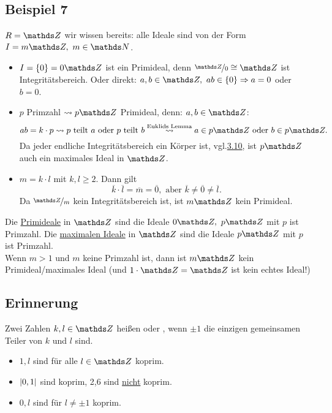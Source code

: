 \subsection{Beispiel 7}
\label{sub:bsp_7}
$R=\Z$ wir wissen bereits: alle Ideale sind von der Form $I=m\Z,~m\in \N$.
\begin{itemize}
	\item $I=\{0\}=0\Z$ ist ein Primideal, denn $\nicefrac{\Z}{0}\cong \Z$ ist Integritätsbereich.
	Oder direkt: $a,b\in \Z,~ab\in\{0\}\Rightarrow a=0$ oder $b=0$.
	\item $p$ Primzahl $\rightsquigarrow p\Z$ Primideal, denn: $a,b\in\Z$:
	\[
	ab=k\cdot p\rightsquigarrow p\text{ teilt }a\text{ oder }p\text{ teilt }b\stackrel{\text{Euklids Lemma}}{\rightsquigarrow}a\in p\Z \text{ oder }b\in p\Z.
	\]
	Da jeder endliche Integritätsbereich ein Körper ist, vgl.\hyperref[sub:def_integritaetsbereich]{3.10}, ist $p\Z$ auch ein maximales Ideal in $\Z$.
	\item $m=k\cdot l$ mit $k,l\ge 2$.
	Dann gilt 
	\[
	\overline{k}\cdot\overline{l}=\overline{m}=\overline{0}, \text{ aber }\overline{k}\neq\overline{0}\neq\overline{l}.
	\]
	Da $\nicefrac{\Z}{m}$ kein Integritätsbereich ist, ist $m\Z$ kein Primideal.
\end{itemize}
Die \uline{Primideale} in $\Z$ sind die Ideale $0\Z,~p\Z$ mit $p$ ist Primzahl.
Die \uline{maximalen Ideale} in $\Z$ sind die Ideale $p\Z$ mit $p$ ist Primzahl.\\
Wenn $m>1$ und $m$ keine Primzahl ist, dann ist $m\Z$ kein Primideal/maximales Ideal (und $1\cdot \Z=\Z$ ist kein echtes Ideal!)


\subsection{Erinnerung}
\label{sub:erinnerung}
Zwei Zahlen $k,l\in \Z$ heißen  oder , wenn $\pm 1$ die einzigen gemeinsamen Teiler von $k$ und $l$ sind.\\

\begin{itemize}
	\item $1,l$ sind für alle $l\in \Z$ koprim.
	\item $\left\vert0,1\right\vert$ sind koprim, 2,6 sind \uline{nicht} koprim.
	\item $0,l$ sind für $l\neq\pm 1$ koprim.
\end{itemize}

